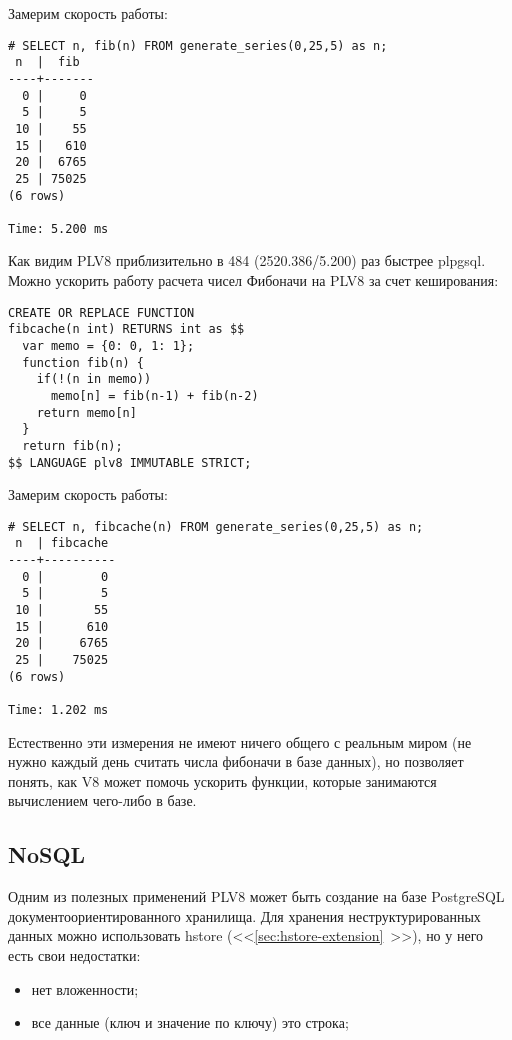 Замерим скорость работы:

\begin{lstlisting}[label=lst:plv8js4,caption=Скорость расчета числа Фибоначчи на plv8]
# SELECT n, fib(n) FROM generate_series(0,25,5) as n;
 n  |  fib
----+-------
  0 |     0
  5 |     5
 10 |    55
 15 |   610
 20 |  6765
 25 | 75025
(6 rows)

Time: 5.200 ms
\end{lstlisting}

Как видим PLV8 приблизительно в 484 (2520.386/5.200) раз быстрее plpgsql. Можно ускорить работу расчета чисел Фибоначи на PLV8 за счет кеширования:

\begin{lstlisting}[label=lst:plv8js5,caption=Фибоначчи на plv8]
CREATE OR REPLACE FUNCTION
fibcache(n int) RETURNS int as $$
  var memo = {0: 0, 1: 1};
  function fib(n) {
    if(!(n in memo))
      memo[n] = fib(n-1) + fib(n-2)
    return memo[n]
  }
  return fib(n);
$$ LANGUAGE plv8 IMMUTABLE STRICT;
\end{lstlisting}

Замерим скорость работы:

\begin{lstlisting}[label=lst:plv8js6,caption=Скорость расчета числа Фибоначчи на plv8]
# SELECT n, fibcache(n) FROM generate_series(0,25,5) as n;
 n  | fibcache
----+----------
  0 |        0
  5 |        5
 10 |       55
 15 |      610
 20 |     6765
 25 |    75025
(6 rows)

Time: 1.202 ms
\end{lstlisting}

Естественно эти измерения не имеют ничего общего с реальным миром (не нужно каждый день считать числа фибоначи в базе данных), но позволяет понять, как V8 может помочь ускорить функции, которые занимаются вычислением чего-либо в базе.

\subsection{NoSQL}

Одним из полезных применений PLV8 может быть создание на базе PostgreSQL документоориентированного хранилища. Для хранения неструктурированных данных можно использовать hstore (<<\ref{sec:hstore-extension}~>>), но у него есть свои недостатки:

\begin{itemize}
  \item нет вложенности;
  \item все данные (ключ и значение по ключу) это строка;
\end{itemize}

